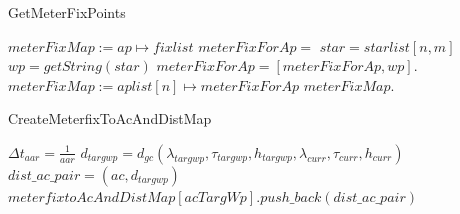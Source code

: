 \documentclass[11pt]{book}              %
\begin{document}
\begin{algorithm}[htbp]
\caption{GetMeterFixPoints}\label{alg:MNSalgo0}
\begin{algorithmic}[1]
\State $meterFixMap:=ap\mapsto fixlist$
\State $meterFixForAp={}$
\State $star = starlist[n,m]$
\State $wp = getString(star)$ 
\State $meterFixForAp=[meterFixForAp,wp]$.
\EndIf
\EndFor
\State $meterFixMap:= aplist[n]\mapsto meterFixForAp$
\EndFor
\State \Return $meterFixMap$.
\EndProcedure
\end{algorithmic}
\end{algorithm}



\begin{algorithm}[htbp]
\caption{CreateMeterfixToAcAndDistMap}\label{alg:MNSalgo1}
\begin{algorithmic}[1]
\State $\Delta t_{aar} = \frac{1}{aar}$
\State $d_{targwp} = d_{gc}(\lambda_{targwp},\tau_{targwp}, h_{targwp},\lambda_{curr},\tau_{curr}, h_{curr})$
\State $dist\_ ac\_pair = (ac,d_{targwp})$
\State $meterfixtoAcAndDistMap[acTargWp].push\_back(dist\_ ac\_ pair)$
\EndIf
\EndIf
\EndProcedure
\end{algorithmic}
\end{algorithm}
\end{document}
